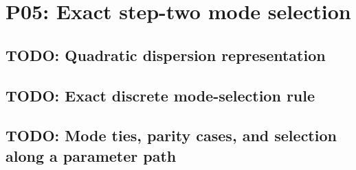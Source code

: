 
\section{P05: Exact step-two mode selection}
\label{sec:P05}

\subsection{TODO: Quadratic dispersion representation}
\label{slot:P05-1}

\subsection{TODO: Exact discrete mode-selection rule}
\label{slot:P05-2}

\subsection{TODO: Mode ties, parity cases, and selection along a parameter path}
\label{slot:P05-3}
